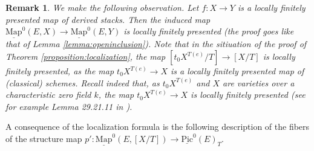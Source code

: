 \documentclass[11pt,letterpaper]{amsart}
\newtheorem{remark}[dummy]{Remark}
\newcommand{\Mapo}[2]{\underline{\mathrm{Map}}^{0}\left (#1,#2\right )}
\newcommand{\Pic}{\underline{\mathrm{Pic}}}
\begin{document}
\begin{remark}
\label{locallyfinpreseq}
We make the following observation. Let $f:X\rightarrow Y$ is a locally finitely presented map of derived stacks. Then the induced map 
$\Mapo{E}{X}\to\Mapo{E}{Y}$ is locally finitely presented (the proof goes like that of Lemma \ref{lemma:openinclusion}). Note that in the sitiuation of the proof of Theorem \ref{proposition:localization}, the map $[t_0 X^{T(e)}/T]\to [X/T]$ is locally finitely presented, as the map $t_0 X^{T(e)}\rightarrow X$ is a locally finitely presented map of (classical) schemes. Recall indeed that, as $t_0 X^{T(e)}$ and $X$ are varieties over a characteristic zero field $k$, the map $t_0 X^{T(e)}\rightarrow X$ is locally finitely presented (see for example Lemma 29.21.11 in \cite[\href{https://stacks.math.columbia.edu/tag/01TO}{Tag 01TO}]{StacksProj1}). 
\end{remark}

A consequence of the localization formula is the following description of the fibers of the structure map $p':\Mapo{E}{[X/T]}\rightarrow\Pic^0(E)_T$.
\end{document}
